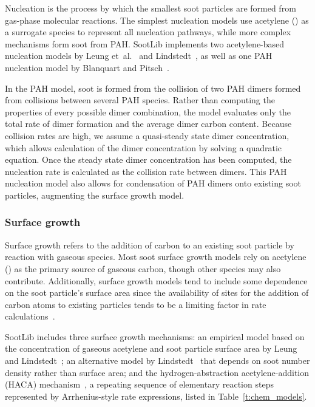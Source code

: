 \documentclass[preprint,letterpaper]{elsarticle}
\begin{document}
Nucleation is the process by which the smallest soot particles are formed from gas-phase molecular reactions.
The simplest nucleation models use acetylene () as a surrogate species to represent all nucleation pathways, while more complex mechanisms form soot from PAH. SootLib implements two acetylene-based nucleation models by Leung et~al.~\cite{Leung_1991} and Lindstedt~\cite{Lindstedt_2005}, as well as one PAH nucleation model by Blanquart and Pitsch~\cite{Blanquart_2009c}.

In the PAH model, soot is formed from the collision of two PAH dimers formed from collisions between several PAH species.
Rather than computing the properties of every possible dimer combination, the model evaluates only the total rate of dimer formation and the average dimer carbon content.
Because collision rates are high, we assume a quasi-steady state dimer concentration, which allows calculation of the dimer concentration by solving a quadratic equation.
Once the steady state dimer concentration has been computed, the nucleation rate is calculated as the collision rate between dimers.
This PAH nucleation model also allows for condensation of PAH dimers onto existing soot particles, augmenting the surface growth model.

\subsubsection{Surface growth}
\label{s:grw}

Surface growth refers to the addition of carbon to an existing soot particle by reaction with gaseous species. Most soot surface growth models rely on acetylene () as the primary source of gaseous carbon, though other species may also contribute. Additionally, surface growth models tend to include some dependence on the soot particle's surface area since the availability of sites for the addition of carbon atoms to existing particles tends to be a limiting factor in rate calculations~\cite{Wang_2011}.

SootLib includes three surface growth mechanisms: an empirical model based on the concentration of gaseous acetylene and soot particle surface area by Leung and Lindstedt~\cite{Leung_1991}; an alternative model by Lindstedt~\cite{Lindstedt_1994} that depends on soot number density rather than surface area; and the hydrogen-abstraction acetylene-addition (HACA) mechanism~\cite{Appel_2000}, a repeating sequence of elementary reaction steps represented by Arrhenius-style rate expressions, listed in Table~\ref{t:chem_models}.
\end{document}
